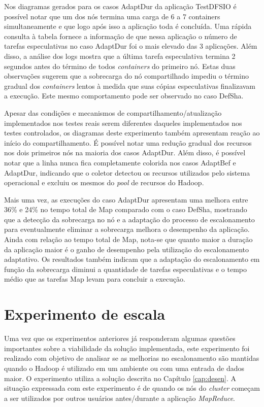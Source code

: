 Nos diagramas gerados para os casos AdaptDur da aplicação TestDFSIO é possível notar que um dos nós termina uma carga de 6 a 7 containers simultaneamente e que logo após isso a aplicação toda é concluída. Uma rápida consulta à tabela fornece a informação de que nessa aplicação o número de tarefas especulativas no caso AdaptDur foi o mais elevado das 3 aplicações. Além disso, a análise dos logs mostra que a última tarefa especulativa termina 2 segundos antes do término de todos \textit{containers} do primeiro nó. Estas duas observações sugerem que a sobrecarga do nó compartilhado impediu o término gradual dos \textit{containers} lentos à medida que suas cópias especulativas finalizavam a execução. Este mesmo comportamento pode ser observado no caso DefSha.

Apesar das condições e mecanismos de compartilhamento/atualização implementados nos testes reais serem diferentes daqueles implementados nos testes controlados, os diagramas deste experimento também apresentam reação ao início do compartilhamento. É possível notar uma redução gradual dos recursos nos dois primeiros nós na maioria dos casos AdaptDur. Além disso, é possível notar que a linha nunca fica completamente colorida nos casos AdaptBef e AdaptDur, indicando que o coletor detectou os recursos utilizados pelo sistema operacional e excluiu os mesmos do \textit{pool} de recursos do Hadoop.

Mais uma vez, as execuções do caso AdaptDur apresentam uma melhora entre 36\% e 24\% no tempo total de Map comparado com o caso DefSha, mostrando que a detecção da sobrecarga no nó e a adaptação do processo de escalonamento para eventualmente eliminar a sobrecarga melhora o desempenho da aplicação. Ainda com relação ao tempo total de Map, nota-se que quanto maior a duração da aplicação maior é o ganho de desempenho pela utilização do escalonamento adaptativo. Os resultados também indicam que a adaptação do escalonamento em função da sobrecarga diminui a quantidade de tarefas especulativas e o tempo médio que as tarefas Map levam para concluir a execução. 


\section{Experimento de escala}
Uma vez que os experimentos anteriores já responderam algumas questões importantes sobre a viabilidade da solução implementada, este experimento foi realizado com objetivo de analisar se as melhorias no escalonamento são mantidas quando o Hadoop é utilizado em um ambiente ou com uma entrada de dados maior. O experimento utiliza a solução descrita no Capítulo \ref{cap:desen}. A situação expressada com este experimento é de quando os nós do \textit{cluster} começam a ser utilizados por outros usuários antes/durante a aplicação \textit{MapReduce}.

